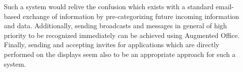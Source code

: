 Such a system would relive the confusion which exists with a standard email-based exchange of information by pre-categorizing future incoming information and data.
Additionally, sending broadcasts and messages in general of high priority to be recognized immediately can be achieved using Augmented Office.
Finally, sending and accepting invites for applications which are directly performed on the displays seem also to be an appropriate approach for such a system. 

